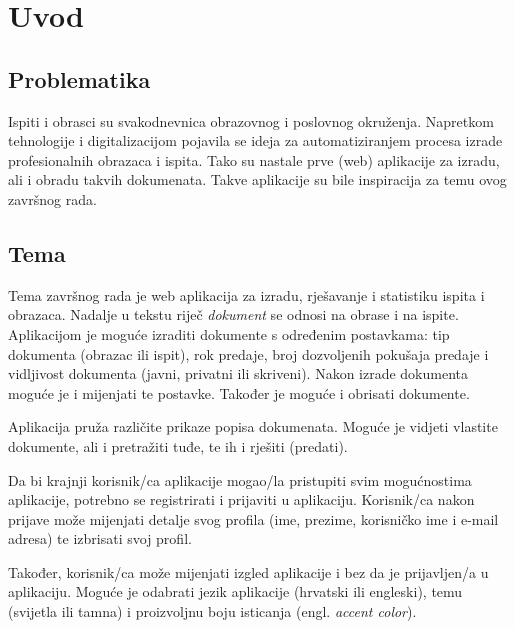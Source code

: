 





\tableofcontents

\newpage

\section{Uvod}

  \subsection{Problematika}

    Ispiti i obrasci su svakodnevnica obrazovnog i poslovnog okruženja. Napretkom
    tehnologije i digitalizacijom pojavila se ideja za automatiziranjem procesa
    izrade profesionalnih obrazaca i ispita. Tako su nastale prve (web) aplikacije
    za izradu, ali i obradu takvih dokumenata. Takve aplikacije su bile
    inspiracija za temu ovog završnog rada.

  \subsection{Tema}

    Tema završnog rada je web aplikacija za izradu, rješavanje i statistiku
    ispita i obrazaca. Nadalje u tekstu riječ \textit{dokument} se odnosi na
    obrase i na ispite. Aplikacijom je moguće izraditi dokumente s određenim
    postavkama: tip dokumenta (obrazac ili ispit), rok predaje, broj dozvoljenih
    pokušaja predaje i vidljivost dokumenta (javni, privatni ili skriveni).
    Nakon izrade dokumenta moguće je i mijenjati te postavke. Također je moguće
    i obrisati dokumente.

    Aplikacija pruža različite prikaze popisa dokumenata. Moguće je vidjeti
    vlastite dokumente, ali i pretražiti tuđe, te ih i rješiti (predati).

    Da bi krajnji korisnik/ca aplikacije mogao/la pristupiti svim mogućnostima
    aplikacije, potrebno se registrirati i prijaviti u aplikaciju. Korisnik/ca
    nakon prijave može mijenjati detalje svog profila (ime, prezime, korisničko
    ime i e-mail adresa) te izbrisati svoj profil.

    Također, korisnik/ca može mijenjati izgled aplikacije i bez da je
    prijavljen/a u aplikaciju. Moguće je odabrati jezik aplikacije (hrvatski ili
    engleski), temu (svijetla ili tamna) i proizvoljnu boju isticanja (engl.
    \textit{accent color}).

